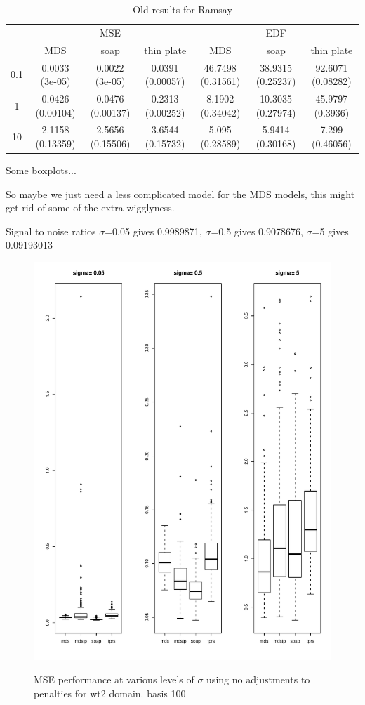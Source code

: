 \documentclass[a4paper,10pt]{article}
\begin{document}
\begin{table}[ht]
\centering
\begin{tabular}{c c c c c c c}
 & & MSE & &  & EDF & \\ 
 & MDS & soap & thin plate & MDS & soap & thin plate\\ 
0.1  & 0.0033 (3e-05) & 0.0022 (3e-05) & 0.0391 (0.00057) &46.7498 (0.31561) & 38.9315 (0.25237) & 92.6071 (0.08282)\\ 
1  & 0.0426 (0.00104) & 0.0476 (0.00137) & 0.2313 (0.00252) &8.1902 (0.34042) & 10.3035 (0.27974) & 45.9797 (0.3936)\\ 
10  & 2.1158 (0.13359) & 2.5656 (0.15506) & 3.6544 (0.15732) &5.095 (0.28589) & 5.9414 (0.30168) & 7.299 (0.46056)\\ 
\end{tabular}
\caption{Old results for Ramsay}
\end{table}

Some boxplots...

So maybe we just need a less complicated model for the MDS models, this might get rid of some of the extra wigglyness.

Signal to noise ratios $\sigma$=0.05 gives 0.9989871, $\sigma$=0.5 gives 0.9078676, $\sigma$=5 gives 0.09193013 

\begin{figure}
\centering
\includegraphics[width=6in]{su-figs/wt2-mds-boxplots.pdf} \\
\caption{MSE performance at various levels of $\sigma$ using no adjustments to penalties for wt2 domain. basis 100}
\label{wt2-boxplots-old}
\end{figure}
\end{document}
